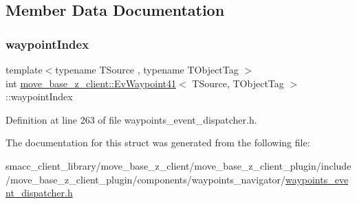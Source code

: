 \subsection{Member Data Documentation}
\mbox{\label{structmove__base__z__client_1_1EvWaypoint41_aad92d0cca43e0daf057fa3c0ee79cdd7}} 
\subsubsection{\texorpdfstring{waypoint\+Index}{waypointIndex}}
{\footnotesize\ttfamily template$<$typename T\+Source , typename T\+Object\+Tag $>$ \\
int \hyperlink{structmove__base__z__client_1_1EvWaypoint41}{move\+\_\+base\+\_\+z\+\_\+client\+::\+Ev\+Waypoint41}$<$ T\+Source, T\+Object\+Tag $>$\+::waypoint\+Index}



Definition at line 263 of file waypoints\+\_\+event\+\_\+dispatcher.\+h.



The documentation for this struct was generated from the following file\+:\begin{DoxyCompactItemize}
\item 
smacc\+\_\+client\+\_\+library/move\+\_\+base\+\_\+z\+\_\+client/move\+\_\+base\+\_\+z\+\_\+client\+\_\+plugin/include/move\+\_\+base\+\_\+z\+\_\+client\+\_\+plugin/components/waypoints\+\_\+navigator/\hyperlink{waypoints__event__dispatcher_8h}{waypoints\+\_\+event\+\_\+dispatcher.\+h}\end{DoxyCompactItemize}
